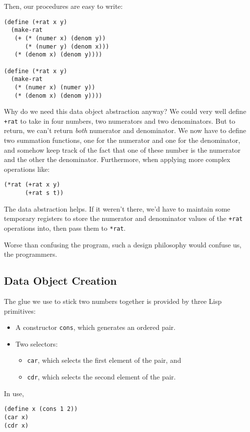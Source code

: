 \documentclass[9pt]{report}
\begin{document}
Then, our procedures are easy to write:

\begin{verbatim}
(define (+rat x y)
  (make-rat
   (+ (* (numer x) (denom y))
      (* (numer y) (denom x)))
   (* (denom x) (denom y))))

(define (*rat x y)
  (make-rat
   (* (numer x) (numer y))
   (* (denom x) (denom y))))
\end{verbatim}

Why do we need this data object abstraction anyway? We could very
well define \texttt{+rat} to take in four numbers, two numerators and two
denominators. But to return, we can't return \emph{both} numerator and
denominator. We now have to define two summation functions, one for
the numerator and one for the denominator, and somehow keep track
of the fact that one of these number is the numerator and the other
the denominator. Furthermore, when applying more complex operations
like:

\begin{verbatim}
(*rat (+rat x y)
      (+rat s t))
\end{verbatim}

The data abstraction helps. If it weren't there, we'd have to
maintain some temporary registers to store the numerator and
denominator values of the \texttt{+rat} operations into, then pass them to
\texttt{*rat}.

Worse than confusing the program, such a design philosophy would
confuse us, the programmers.

\subsection{Data Object Creation}
\label{sec:org522bf84}

The glue we use to stick two numbers together is provided by three
Lisp primitives:
\begin{itemize}
\item A constructor \texttt{cons}, which generates an ordered pair.
\item Two selectors:
\begin{itemize}
\item \texttt{car}, which selects the first element of the pair, and
\item \texttt{cdr}, which selects the second element of the pair.
\end{itemize}
\end{itemize}

In use,
\begin{verbatim}
(define x (cons 1 2))
(car x)
(cdr x)
\end{verbatim}
\end{document}
